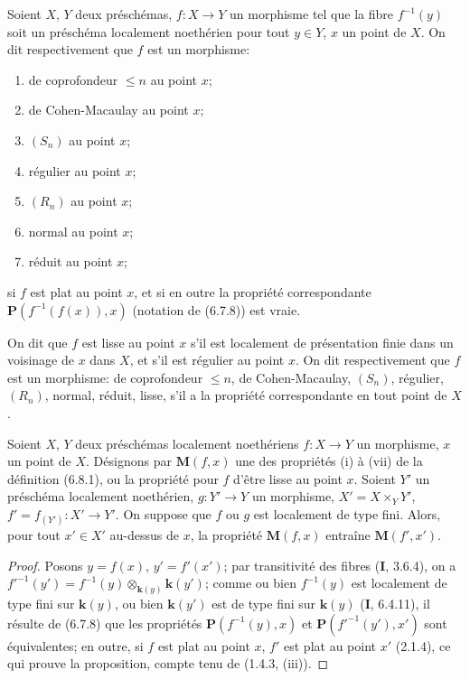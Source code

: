 \begin{definition}[6.8.1]
\label{IV.2.s6.8.1-fr}
Soient $X$, $Y$ deux préschémas, $f:X\to Y$ un morphisme tel que la fibre
$f^{-1}(y)$ soit un préschéma localement noethérien pour tout $y\in Y$, $x$
un point de $X$. On dit respectivement que $f$ est un morphisme:
\begin{enumerate}
\item[\textup{(i)}] de coprofondeur $\leq n$ au point $x$;
\item[\textup{(ii)}] de Cohen-Macaulay au point $x$;
\item[\textup{(iii)}] $(S_n)$ au point $x$;
\item[\textup{(iv)}] régulier au point $x$;
\item[\textup{(v)}] $(R_n)$ au point $x$;
\item[\textup{(vi)}] normal au point $x$;
\item[\textup{(vii)}] réduit au point $x$;
\end{enumerate}
si $f$ est plat au point $x$, et si en outre la propriété correspondante
$\boldsymbol{P}(f^{-1}(f(x)),x)$ (notation de \textup{(6.7.8)}) est vraie.

On dit que $f$ est lisse au point $x$ s'il est localement de présentation finie
dans un voisinage de $x$ dans $X$, et s'il est régulier au point $x$. On dit
respectivement que $f$ est un morphisme: de coprofondeur $\leq n$, de
Cohen-Macaulay, $(S_n)$, régulier, $(R_n)$, normal, réduit, lisse, s'il a la
propriété correspondante en tout point de $X$.
\end{definition}

\begin{proposition}[6.8.2]
\label{IV.2.s6.8.2-fr}
Soient $X$, $Y$ deux préschémas localement noethériens $f:X\to Y$ un
morphisme, $x$ un point de $X$. Désignons par $\boldsymbol{M}(f,x)$ une des propriétés
\textup{(i)} à \textup{(vii)} de la définition \textup{(6.8.1)}, ou la propriété pour $f$ d'être lisse au
point $x$. Soient $Y'$ un préschéma localement noethérien, $g:Y'\to Y$ un
morphisme, $X'=X\times_Y Y'$, $f'=f_{(Y')}:X'\to Y'$. On suppose que $f$
ou $g$ est localement de type fini. Alors, pour tout $x'\in X'$ au-dessus de
$x$, la propriété $\boldsymbol{M}(f,x)$ entraîne $\boldsymbol{M}(f',x')$.
\end{proposition}

\begin{proof}
Posons $y=f(x)$, $y'=f'(x')$; par transitivité des fibres (\textbf{I}, 3.6.4), on a
$f'^{-1}(y')=f^{-1}(y)\otimes_{\mathbf{k}(y)}\boldsymbol{k}(y')$; comme ou bien $f^{-1}(y)$ est localement de type fini sur $\boldsymbol{k}(y)$, ou bien
$\boldsymbol{k}(y')$ est de type fini sur $\boldsymbol{k}(y)$ (\textbf{I}, 6.4.11), il résulte de (6.7.8) que
les propriétés $\boldsymbol{P}(f^{-1}(y),x)$ et $\boldsymbol{P}(f'^{-1}(y'),x')$ sont équivalentes; en
outre, si $f$ est plat au point $x$, $f'$ est plat au point $x'$ (2.1.4), ce
qui prouve la proposition, compte tenu de (1.4.3, (iii)).
\end{proof}

